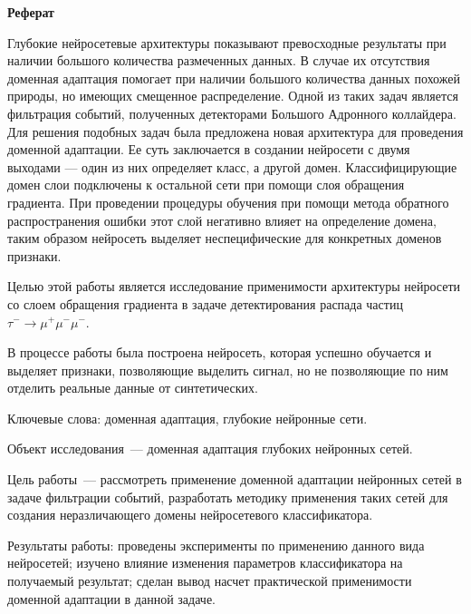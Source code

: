 \documentclass[14pt]{extarticle}
\begin{document}
\newpage

\setcounter{page}{1}
\thispagestyle{empty}

\centerline{\large \textbf{Реферат}}

\bigskip
\bigskip

Глубокие нейросетевые архитектуры показывают превосходные результаты при наличии большого количества размеченных данных. В случае их отсутствия доменная адаптация помогает при наличии большого количества данных похожей природы, но имеющих смещенное распределение.
Одной из таких задач является фильтрация событий, полученных детекторами Большого Адронного коллайдера.
Для решения подобных задач была предложена новая архитектура для проведения доменной адаптации.
Ее суть заключается в создании нейросети с двумя выходами — один из них определяет класс, а другой домен.
Классифицирующие домен слои подключены к остальной сети при помощи слоя обращения градиента.
При проведении процедуры обучения при помощи метода обратного распространения ошибки этот слой негативно влияет на определение домена, таким образом нейросеть выделяет неспецифические для конкретных доменов признаки.

Целью этой работы является исследование применимости архитектуры нейросети со слоем обращения градиента в задаче детектирования распада частиц $\tau^- \rightarrow \mu^+ \mu^- \mu^-$.

В процессе работы была построена нейросеть, которая успешно обучается и выделяет признаки, позволяющие выделить сигнал, но не позволяющие по ним отделить реальные данные от синтетических.


\medskip

\noindent
Ключевые слова: доменная адаптация, глубокие нейронные сети.

\medskip 

\noindent
Объект исследования~— доменная адаптация глубоких нейронных сетей.

\medskip 

\noindent
Цель работы~— рассмотреть применение доменной адаптации нейронных сетей в задаче фильтрации событий, разработать методику применения таких сетей для создания неразличающего домены нейросетевого классификатора.

\medskip 

\noindent
Результаты работы: проведены эксперименты по применению данного вида нейросетей; изучено влияние изменения параметров классификатора на получаемый результат; сделан вывод насчет практической применимости доменной адаптации в данной задаче.
\end{document}

